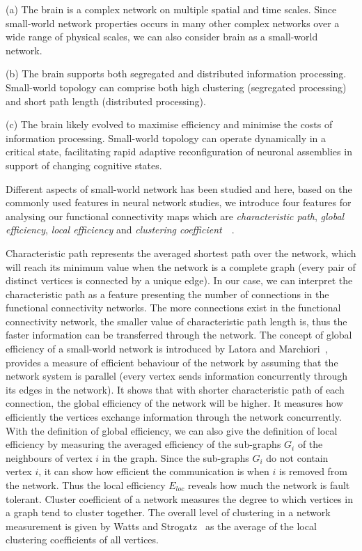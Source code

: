 (a) The brain is a complex network on multiple spatial and time scales. Since small-world network properties occurs in many other complex networks over a wide range of physical scales, we can also consider brain as a small-world network.

(b) The brain supports both segregated and distributed information processing. Small-world topology can comprise both high clustering (segregated processing) and short path length (distributed processing).

(c) The brain likely evolved to maximise efficiency and minimise the costs of information processing. Small-world topology can operate dynamically in a critical state, facilitating rapid adaptive reconfiguration of neuronal assemblies in support of changing cognitive states.

Different aspects of small-world network has been studied and here, based on the commonly used features in neural network studies, we introduce four features for analysing our functional connectivity maps which are \emph{characteristic path}, \emph{global efficiency}, \emph{local efficiency} and \emph{clustering coefficient}~\cite{watts1998collective}~\cite{latora2001efficient}.

Characteristic path represents the averaged shortest path over the network, which will reach its minimum value when the network is a complete graph (every pair of distinct vertices is connected by a unique edge). In our case, we can interpret the characteristic path as a feature presenting the number of connections in the functional connectivity networks. The more connections exist in the functional connectivity network, the smaller value of characteristic path length is, thus the faster information can be transferred through the network. The concept of global efficiency of a small-world network is introduced by Latora and Marchiori~\cite{latora2001efficient}, provides a measure of efficient behaviour of the network by assuming that the network system is parallel (every vertex sends information concurrently through its edges in the network). It shows that with shorter characteristic path of each connection, the global efficiency of the network will be higher. It measures how efficiently the vertices exchange information through the network concurrently. With the definition of global efficiency, we can also give the definition of local efficiency by measuring the averaged efficiency of the sub-graphs \textbf{$G_i$} of the neighbours of vertex $i$ in the graph. Since the sub-graphs \textbf{$G_i$} do not contain vertex $i$, it can show how efficient the communication is when $i$ is removed from the network. Thus the local efficiency $E_{loc}$ reveals how much the network is fault tolerant. Cluster coefficient of a network measures the degree to which vertices in a graph tend to cluster together. The overall level of clustering in a network measurement is given by Watts and Strogatz~\cite{watts1998collective} as the average of the local clustering coefficients of all vertices. 

